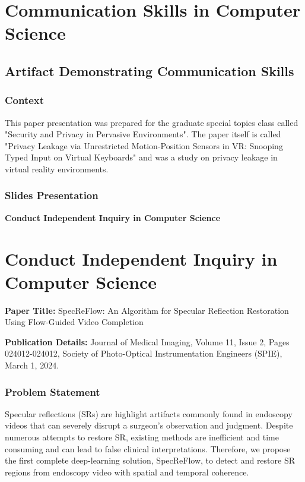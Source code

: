 \documentclass[12pt,letterpaper]{report}
\newcommand{\sectiondivider}[1]{%
    \clearpage
    \thispagestyle{empty}
    \begin{center}
        \vspace*{\fill}
        {\Huge\bfseries\textcolor{vanderbiltblack}{#1}}
        \vspace*{\fill}
    \end{center}
    \clearpage
}
\begin{document}
\chapter{Communication Skills in Computer Science}

\section{Artifact Demonstrating Communication Skills}

\subsection{Context}
This paper presentation was prepared for the graduate special topics class called "Security and Privacy in Pervasive Environments". 
The paper itself is called "Privacy Leakage via Unrestricted Motion-Position Sensors in VR: Snooping Typed Input on Virtual Keyboards" and was a study on privacy leakage in virtual reality environments.

\subsection{Slides Presentation}


\sectiondivider{Conduct Independent Inquiry in Computer Science}
\chapter{Conduct Independent Inquiry in Computer Science}

\textbf{Paper Title:} SpecReFlow: An Algorithm for Specular Reflection Restoration Using Flow-Guided Video Completion

\textbf{Publication Details:} Journal of Medical Imaging, Volume 11, Issue 2, Pages 024012-024012, Society of Photo-Optical Instrumentation Engineers (SPIE), March 1, 2024.

\subsection{Problem Statement}
Specular reflections (SRs) are highlight artifacts commonly found in endoscopy videos that can severely disrupt a surgeon's observation and judgment. Despite numerous attempts to restore SR, existing methods are inefficient and time consuming and can lead to false clinical interpretations. Therefore, we propose the first complete deep-learning solution, SpecReFlow, to detect and restore SR regions from endoscopy video with spatial and temporal coherence.
\end{document}
